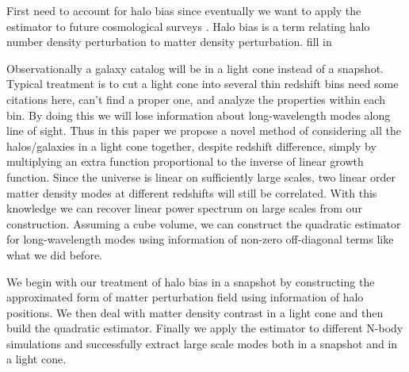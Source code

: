 \documentclass[prd,amsmath,amssymb,floatfix,superscriptaddress,nofootinbib,twocolumn]{revtex4-1}
\newcommand{\peikai}[1]{{\color{blue} #1}}
\begin{document}
First need to account for halo bias \cite{Kravtsov:1999hb}\cite{Desjacques:2018rev} since eventually we want to apply the estimator to future cosmological surveys \cite{LSST:2012ls}\cite{Wfirst:2012jg}\cite{DESI:2019ds}. Halo bias is a term relating halo number density perturbation to matter density perturbation. \peikai{fill in}

Observationally a galaxy catalog will be in a light cone \cite{Carroll:1997gr} instead of a snapshot. Typical  treatment is to cut a light cone into several thin redshift bins \peikai{need some citations here, can't find a proper one}, and analyze the properties within each bin. By doing this we will lose information about long-wavelength modes along line of sight. Thus in this paper we propose a novel method of considering all the halos/galaxies in a light cone together, despite redshift difference, simply by multiplying an extra function proportional to the inverse of linear growth function. Since the universe is linear on sufficiently large scales, two linear order matter density modes at different redshifts will still be correlated. With this knowledge we can recover linear power spectrum on large scales from our construction. Assuming a cube volume, we can construct the quadratic estimator for long-wavelength modes using information of non-zero off-diagonal terms like what we did before.

We begin with our treatment of halo bias in a snapshot by constructing the approximated form of matter perturbation field using information of halo positions. We then deal with matter density contrast in a light cone and then build the quadratic estimator. Finally we apply the estimator to different N-body simulations and successfully extract large scale modes both in a snapshot and in a light cone.
\end{document}
